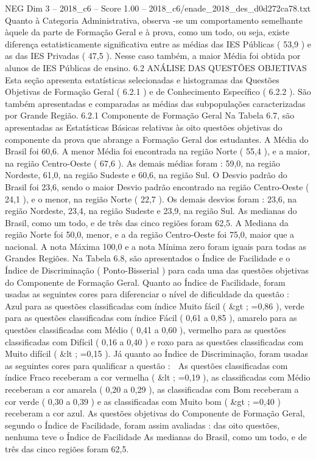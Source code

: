 \begin{textsample}{NEG Dim 3 – 2018\_c6 – Score 1.00 – 2018\_c6/enade\_2018\_des\_d0d272ca78.txt}
Quanto à Categoria Administrativa, observa -se um comportamento semelhante àquele da parte de Formação Geral e à prova, como um todo, ou seja, existe diferença estatisticamente significativa entre as médias das IES Públicas ( 53,9 ) e as das IES Privadas ( 47,5 ).
Nesse caso também, a maior Média foi obtida por alunos de IES Públicas de ensino. 6.2 ANÁLISE DAS QUESTÕES OBJETIVAS Esta seção apresenta estatísticas selecionadas e histogramas das Questões Objetivas de Formação Geral ( 6.2.1 ) e de Conhecimento Específico ( 6.2.2 ).
São também apresentadas e comparadas as médias das subpopulações caracterizadas por Grande Região. 6.2.1 Componente de Formação Geral Na Tabela 6.7, são apresentadas as Estatísticas Básicas relativas às oito questões objetivas do componente da prova que abrange a Formação Geral dos estudantes.
A Média do Brasil foi 60,6.
A menor Média foi encontrada na região Norte ( 55,4 ), e a maior, na região Centro-Oeste ( 67,6 ).
As demais médias foram : 59,0, na região Nordeste, 61,0, na região Sudeste e 60,6, na região Sul.
O Desvio padrão do Brasil foi 23,6, sendo o maior Desvio padrão encontrado na região Centro-Oeste ( 24,1 ), e o menor, na região Norte ( 22,7 ).
Os demais desvios foram : 23,6, na região Nordeste, 23,4, na região Sudeste e 23,9, na região Sul.
As medianas do Brasil, como um todo, e de três das cinco regiões foram 62,5.
A Mediana da região Norte foi 50,0, menor, e a da região Centro-Oeste foi 75,0, maior que a nacional.
A nota Máxima 100,0 e a nota Mínima zero foram iguais para todas as Grandes Regiões.
Na Tabela 6.8, são apresentados o Índice de Facilidade e o Índice de Discriminação ( Ponto-Bisserial ) para cada uma das questões objetivas do Componente de Formação Geral.
Quanto ao Índice de Facilidade, foram usadas as seguintes cores para diferenciar o nível de dificuldade da questão :  Azul para as questões classificadas com índice Muito fácil ( \&gt ; =0,86 ), verde para as questões classificadas com índice Fácil ( 0,61 a 0,85 ), amarelo para as questões classificadas com Médio ( 0,41 a 0,60 ), vermelho para as questões classificadas com Difícil ( 0,16 a 0,40 ) e roxo para as questões classificadas com Muito difícil ( \&lt ; =0,15 ).
Já quanto ao Índice de Discriminação, foram usadas as seguintes cores para qualificar a questão :  As questões classificadas com índice Fraco receberam a cor vermelha ( \&lt ; =0,19 ), as classificadas com Médio receberam a cor amarela ( 0,20 a 0,29 ), as classificadas com Bom receberam a cor verde ( 0,30 a 0,39 ) e as classificadas com Muito bom ( \&gt ; =0,40 ) receberam a cor azul.
As questões objetivas do Componente de Formação Geral, segundo o Índice de Facilidade, foram assim avaliadas : das oito questões, nenhuma teve o Índice de Facilidade As medianas do Brasil, como um todo, e de três das cinco regiões foram 62,5.

\end{textsample}
